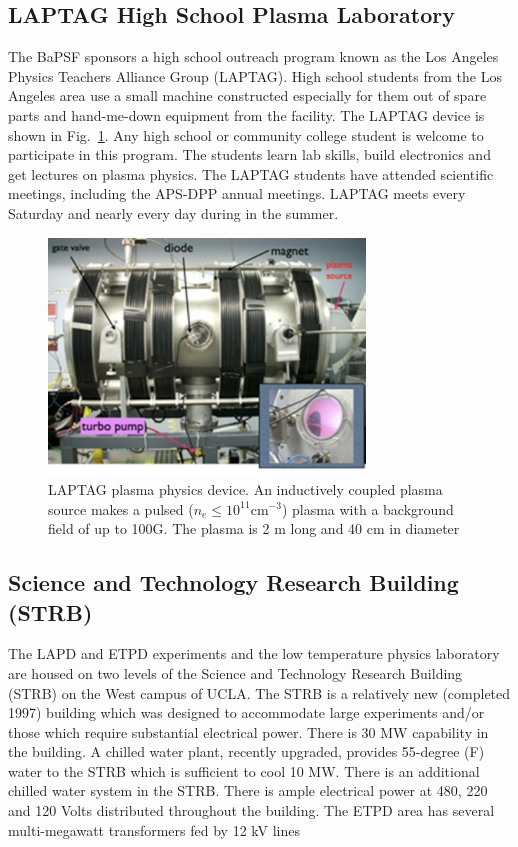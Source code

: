 \documentclass[11pt]{article}
\begin{document}
\subsection{LAPTAG High School Plasma Laboratory}
The BaPSF sponsors a high school outreach program known as the Los Angeles Physics Teachers Alliance Group  (LAPTAG).  High school students from the Los Angeles area use a small machine constructed especially for them out of spare parts and hand-me-down equipment from the facility.  The LAPTAG device is shown in Fig.\ \ref{fig:laptag}.  Any high school or community college student is welcome to participate in this program.  The students learn lab skills, build electronics and get lectures on plasma physics. The LAPTAG students have attended scientific meetings, including the APS-DPP annual meetings.  LAPTAG meets every Saturday and nearly every day during in the summer.
\begin{figure}[htbp] %
   \centering
   \includegraphics[width=0.75\textwidth]{laptag.jpg} 
   \caption{LAPTAG plasma physics device.  An inductively coupled plasma source makes a pulsed ($n_{e}\le 10^{11}$cm$^{-3}$) plasma with a background field of up to 100G.  The plasma is 2 m long and 40 cm in diameter}
   \label{fig:laptag}
\end{figure}


\subsection{Science and Technology Research Building (STRB)}
The LAPD and ETPD experiments and the low temperature physics laboratory are housed on two levels of the Science and Technology Research Building (STRB) on the West campus of UCLA.  The STRB is a relatively new (completed 1997) building which was designed to accommodate large experiments and/or those which require substantial electrical power.  There is 30 MW capability in the building.  A chilled water plant, recently upgraded, provides 55-degree (F) water to the STRB which is sufficient to cool 10 MW.  There is an additional chilled water system in the STRB. There is ample electrical power at 480, 220 and 120 Volts distributed throughout the building.  The ETPD area has several multi-megawatt transformers fed by 12 kV lines
\end{document}
